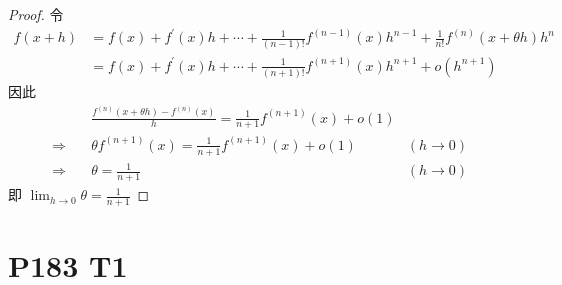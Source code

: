 \documentclass{article}
\newcommand{\ds}{^\prime}
\begin{document}
\begin{proof}
    令 
    \begin{align*}
        f(x + h) & = f(x) + f\ds(x)h + \cdots + \frac{1}{(n - 1)!}f^{(n - 1)}(x)h^{n - 1} + \frac{1}{n!}f^{(n)}(x + \theta h)h^n\\
        & = f(x) + f\ds(x)h + \cdots + \frac{1}{(n + 1)!}f^{(n + 1)}(x)h^{n + 1} + o(h^{n + 1})
    \end{align*}
    因此
    \begin{align*}
        & \frac{f^{(n)}(x + \theta h) - f^{(n)}(x)}{h} = \frac{1}{n + 1}f^{(n + 1)}(x) + o(1) \\
        \Rightarrow \quad & \theta f^{(n + 1)}(x) = \frac{1}{n + 1}f^{(n + 1)}(x) + o(1) & (h \to 0)\\
        \Rightarrow \quad & \theta = \frac{1}{n + 1} & (h \to 0)
    \end{align*}
    即 $\lim_{h \to 0}\theta = \frac{1}{n + 1}$
\end{proof}

\section*{P183 T1}
\end{document}
